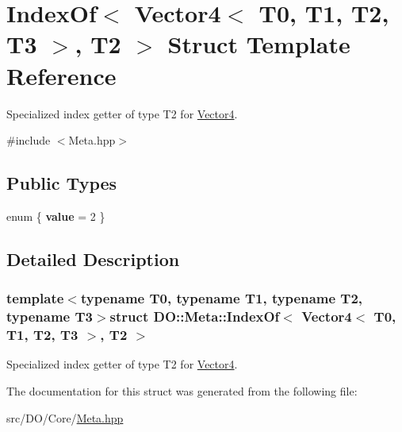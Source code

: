 \hypertarget{struct_d_o_1_1_meta_1_1_index_of_3_01_vector4_3_01_t0_00_01_t1_00_01_t2_00_01_t3_01_4_00_01_t2_01_4}{\section{Index\-Of$<$ Vector4$<$ T0, T1, T2, T3 $>$, T2 $>$ Struct Template Reference}
\label{struct_d_o_1_1_meta_1_1_index_of_3_01_vector4_3_01_t0_00_01_t1_00_01_t2_00_01_t3_01_4_00_01_t2_01_4}
}


Specialized index getter of type T2 for \hyperlink{struct_d_o_1_1_meta_1_1_vector4}{Vector4}.  




{\ttfamily \#include $<$Meta.\-hpp$>$}

\subsection*{Public Types}
\begin{DoxyCompactItemize}
\item 
enum \{ {\bfseries value} = 2
 \}
\end{DoxyCompactItemize}


\subsection{Detailed Description}
\subsubsection*{template$<$typename T0, typename T1, typename T2, typename T3$>$struct D\-O\-::\-Meta\-::\-Index\-Of$<$ Vector4$<$ T0, T1, T2, T3 $>$, T2 $>$}

Specialized index getter of type T2 for \hyperlink{struct_d_o_1_1_meta_1_1_vector4}{Vector4}. 

The documentation for this struct was generated from the following file\-:\begin{DoxyCompactItemize}
\item 
src/\-D\-O/\-Core/\hyperlink{_meta_8hpp}{Meta.\-hpp}\end{DoxyCompactItemize}
